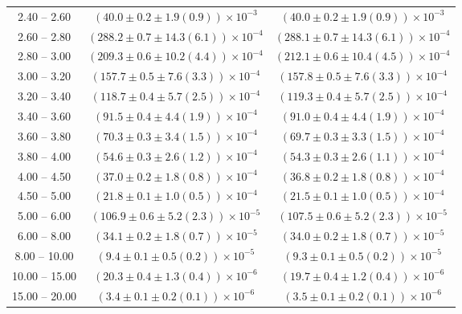 \begin{table}
\begin{center}
\begin{tabular}{ c | c c }
2.40 -- 2.60 & $(40.0\pm0.2\pm1.9(0.9))\times10^{-3}$ & $(40.0\pm0.2\pm1.9(0.9))\times10^{-3}$ \\ 
2.60 -- 2.80 & $(288.2\pm0.7\pm14.3(6.1))\times10^{-4}$ & $(288.1\pm0.7\pm14.3(6.1))\times10^{-4}$ \\ 
2.80 -- 3.00 & $(209.3\pm0.6\pm10.2(4.4))\times10^{-4}$ & $(212.1\pm0.6\pm10.4(4.5))\times10^{-4}$ \\ 
3.00 -- 3.20 & $(157.7\pm0.5\pm7.6(3.3))\times10^{-4}$ & $(157.8\pm0.5\pm7.6(3.3))\times10^{-4}$ \\ 
3.20 -- 3.40 & $(118.7\pm0.4\pm5.7(2.5))\times10^{-4}$ & $(119.3\pm0.4\pm5.7(2.5))\times10^{-4}$ \\ 
3.40 -- 3.60 & $(91.5\pm0.4\pm4.4(1.9))\times10^{-4}$ & $(91.0\pm0.4\pm4.4(1.9))\times10^{-4}$ \\ 
3.60 -- 3.80 & $(70.3\pm0.3\pm3.4(1.5))\times10^{-4}$ & $(69.7\pm0.3\pm3.3(1.5))\times10^{-4}$ \\ 
3.80 -- 4.00 & $(54.6\pm0.3\pm2.6(1.2))\times10^{-4}$ & $(54.3\pm0.3\pm2.6(1.1))\times10^{-4}$ \\ 
4.00 -- 4.50 & $(37.0\pm0.2\pm1.8(0.8))\times10^{-4}$ & $(36.8\pm0.2\pm1.8(0.8))\times10^{-4}$ \\ 
4.50 -- 5.00 & $(21.8\pm0.1\pm1.0(0.5))\times10^{-4}$ & $(21.5\pm0.1\pm1.0(0.5))\times10^{-4}$ \\ 
5.00 -- 6.00 & $(106.9\pm0.6\pm5.2(2.3))\times10^{-5}$ & $(107.5\pm0.6\pm5.2(2.3))\times10^{-5}$ \\ 
6.00 -- 8.00 & $(34.1\pm0.2\pm1.8(0.7))\times10^{-5}$ & $(34.0\pm0.2\pm1.8(0.7))\times10^{-5}$ \\ 
8.00 -- 10.00 & $(9.4\pm0.1\pm0.5(0.2))\times10^{-5}$ & $(9.3\pm0.1\pm0.5(0.2))\times10^{-5}$ \\ 
10.00 -- 15.00 & $(20.3\pm0.4\pm1.3(0.4))\times10^{-6}$ & $(19.7\pm0.4\pm1.2(0.4))\times10^{-6}$ \\ 
15.00 -- 20.00 & $(3.4\pm0.1\pm0.2(0.1))\times10^{-6}$ & $(3.5\pm0.1\pm0.2(0.1))\times10^{-6}$ \\ 
\hline
\end{tabular}
\end{center}
\end{table}
 
